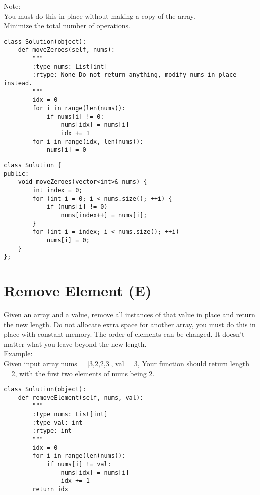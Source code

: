Note:\\
    You must do this in-place without making a copy of the array.\\
    Minimize the total number of operations.\\

\begin{lstlisting}
class Solution(object):
    def moveZeroes(self, nums):
        """
        :type nums: List[int]
        :rtype: None Do not return anything, modify nums in-place instead.
        """
        idx = 0
        for i in range(len(nums)):
            if nums[i] != 0:
                nums[idx] = nums[i]
                idx += 1
        for i in range(idx, len(nums)):
            nums[i] = 0
\end{lstlisting}
            
\begin{lstlisting}
class Solution {
public:
    void moveZeroes(vector<int>& nums) {
        int index = 0;
        for (int i = 0; i < nums.size(); ++i) {
            if (nums[i] != 0)
                nums[index++] = nums[i];
        }
        for (int i = index; i < nums.size(); ++i)
            nums[i] = 0;
    }
};
\end{lstlisting}


\section{Remove Element (E)}
Given an array and a value, remove all instances of that value in place and return the new length. Do not allocate extra space for another array, you must do this in place with constant memory. The order of elements can be changed. It doesn't matter what you leave beyond the new length.\\

Example:\\
Given input array nums = [3,2,2,3], val = 3, Your function should return length = 2, with the first two elements of nums being 2.\\
    
\begin{lstlisting}
class Solution(object):
    def removeElement(self, nums, val):
        """
        :type nums: List[int]
        :type val: int
        :rtype: int
        """
        idx = 0
        for i in range(len(nums)):
            if nums[i] != val:
                nums[idx] = nums[i]
                idx += 1
        return idx
\end{lstlisting}

